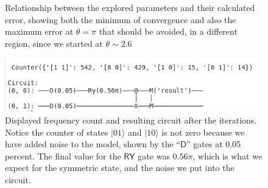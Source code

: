 \documentclass[11pt]{article}
\begin{document}
\begin{figure}[h!]
\caption{Relationship between the explored parameters and their calculated error, showing both the minimum of convergence and also the maximum error at $\theta = \pi$ that should be avoided, in a different region, since we started at $\theta \sim 2.6$}
\vspace{10pt}
\includegraphics[scale=0.5]{result}
\caption{Displayed frequency count and resulting circuit after the iterations. Notice the counter of states $|01\rangle$ and $|10\rangle$ is not zero because we have added noise to the model, shown by the ``$\textsf{D}$'' gates at 0.05 percent. The final value for the $\textsf{RY}$ gate was $0.56 \pi$, which is what we expect for the symmetric state, and the noise we put into the circuit.}
\end{figure}
\end{document}
